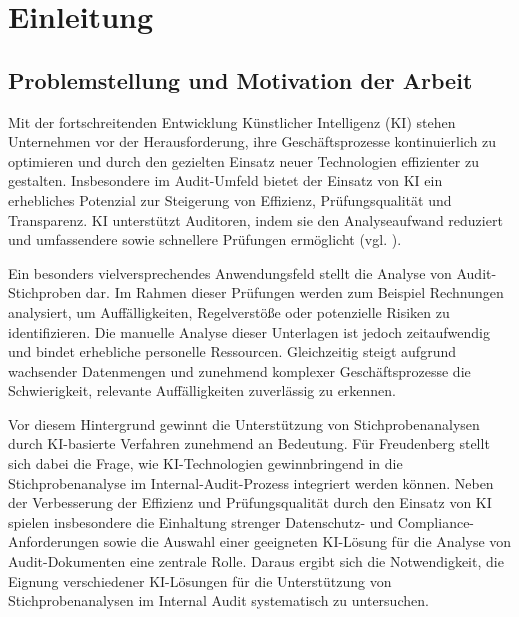 \chapter{Einleitung}

\section{Problemstellung und Motivation der Arbeit} 
Mit der fortschreitenden Entwicklung Künstlicher Intelligenz (\acs{KI}) stehen Unternehmen vor der Herausforderung, ihre Geschäftsprozesse kontinuierlich zu optimieren und durch den gezielten Einsatz neuer Technologien effizienter zu gestalten. Insbesondere im Audit-Umfeld bietet der Einsatz von \ac{KI} ein erhebliches Potenzial zur Steigerung von Effizienz, Prüfungsqualität und Transparenz. \ac{KI} unterstützt Auditoren, indem sie den Analyseaufwand reduziert und umfassendere sowie schnellere Prüfungen ermöglicht (vgl. \cite[S. 11 f.]{wassie2024artificial}).

Ein besonders vielversprechendes Anwendungsfeld stellt die Analyse von Audit-Stichproben dar. Im Rahmen dieser Prüfungen werden zum Beispiel Rechnungen analysiert, um Auffälligkeiten, Regelverstöße oder potenzielle Risiken zu identifizieren. Die manuelle Analyse dieser Unterlagen ist jedoch
zeitaufwendig und bindet erhebliche personelle Ressourcen. Gleichzeitig steigt aufgrund wachsender Datenmengen und zunehmend komplexer Geschäftsprozesse die Schwierigkeit,
relevante Auffälligkeiten zuverlässig zu erkennen.

Vor diesem Hintergrund gewinnt die Unterstützung von Stichprobenanalysen durch \ac{KI}-basierte Verfahren zunehmend an Bedeutung. Für Freudenberg stellt sich dabei die Frage, wie \ac{KI}-Technologien gewinnbringend in die Stichprobenanalyse im Internal-Audit-Prozess integriert werden können. Neben der Verbesserung der Effizienz und Prüfungsqualität durch den Einsatz von \ac{KI} spielen insbesondere die Einhaltung strenger Datenschutz- und Compliance-Anforderungen sowie die Auswahl einer geeigneten \ac{KI}-Lösung für die Analyse von Audit-Dokumenten eine zentrale Rolle. Daraus ergibt sich die Notwendigkeit, die Eignung verschiedener \ac{KI}-Lösungen für die Unterstützung von Stichprobenanalysen im Internal Audit systematisch zu untersuchen.

